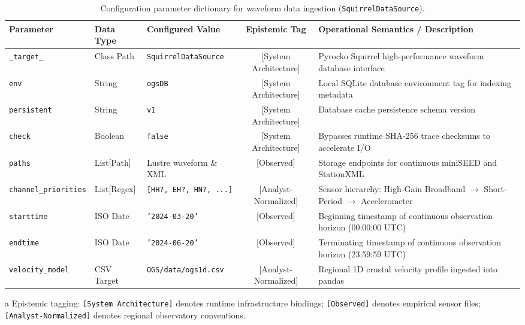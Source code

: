 \begin{table}[htbp]
  \centering
  \small
  \caption{Configuration parameter dictionary for waveform data ingestion (\texttt{SquirrelDataSource}).}
  \label{tab:app_data_dictionary}
  \begin{threeparttable}
    \begin{tabularx}{\linewidth}{l l l c X}
      \toprule
      \textbf{Parameter} & \textbf{Data Type} & \textbf{Configured Value} & \textbf{Epistemic Tag\tnote{a}} & \textbf{Operational Semantics / Description} \\
      \midrule
      \texttt{\_target\_} & Class Path & \texttt{SquirrelDataSource} & [System Architecture] & Pyrocko Squirrel high-performance waveform database interface \\
      \texttt{env} & String & \texttt{ogsDB} & [System Architecture] & Local SQLite database environment tag for indexing metadata \\
      \texttt{persistent} & String & \texttt{v1} & [System Architecture] & Database cache persistence schema version \\
      \texttt{check} & Boolean & \texttt{false} & [System Architecture] & Bypasses runtime SHA-256 trace checksums to accelerate I/O \\
      \texttt{paths} & List[Path] & Lustre waveform \& XML & [Observed] & Storage endpoints for continuous miniSEED and StationXML \\
      \texttt{channel\_priorities} & List[Regex] & \texttt{[HH?, EH?, HN?, ...]} & [Analyst-Normalized] & Sensor hierarchy: High-Gain Broadband $\to$ Short-Period $\to$ Accelerometer \\
      \texttt{starttime} & ISO Date & \texttt{'2024-03-20'} & [Observed] & Beginning timestamp of continuous observation horizon (00:00:00 UTC) \\
      \texttt{endtime} & ISO Date & \texttt{'2024-06-20'} & [Observed] & Terminating timestamp of continuous observation horizon (23:59:59 UTC) \\
      \texttt{velocity\_model} & CSV Target & \texttt{OGS/data/ogs1d.csv} & [Analyst-Normalized] & Regional 1D crustal velocity profile ingested into pandas \\
      \bottomrule
    \end{tabularx}
    \begin{tablenotes}[flushleft]
      \footnotesize
      \item[a] Epistemic tagging: \texttt{[System Architecture]} denotes runtime infrastructure bindings; \texttt{[Observed]} denotes empirical sensor files; \texttt{[Analyst-Normalized]} denotes regional observatory conventions.

\end{tablenotes}
\end{threeparttable}
\end{table}
